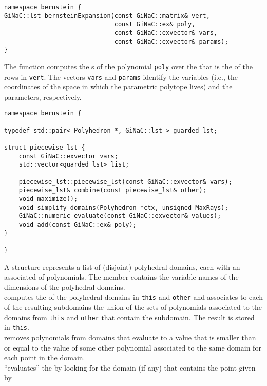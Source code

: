 \begin{verbatim}
namespace bernstein {
GiNaC::lst bernsteinExpansion(const GiNaC::matrix& vert,
                              const GiNaC::ex& poly,
                              const GiNaC::exvector& vars,
                              const GiNaC::exvector& params);
}
\end{verbatim}
The function  computes the
s of the polynomial \verb+poly+
over the  that is the 
of the rows in \verb+vert+.  The vectors \verb+vars+
and \verb+params+ identify the variables (i.e., the coordinates
of the space in which the parametric polytope lives) and
the parameters, respectively.

\begin{verbatim}
namespace bernstein {

typedef std::pair< Polyhedron *, GiNaC::lst > guarded_lst;

struct piecewise_lst {
    const GiNaC::exvector vars;
    std::vector<guarded_lst> list;

    piecewise_lst::piecewise_lst(const GiNaC::exvector& vars);
    piecewise_lst& combine(const piecewise_lst& other);
    void maximize();
    void simplify_domains(Polyhedron *ctx, unsigned MaxRays);
    GiNaC::numeric evaluate(const GiNaC::exvector& values);
    void add(const GiNaC::ex& poly);
}

}
\end{verbatim}
A  structure represents a list of (disjoint)
polyhedral domains, each with an associated 
of polynomials.
The  member contains the variable names of the
dimensions of the polyhedral domains.
\\
 computes the 
of the polyhedral domains in \verb+this+ and \verb+other+ and associates
to each of the resulting subdomains the union of the sets of polynomials
associated to the domains from \verb+this+ and \verb+other+ that contain
the subdomain.
The result is stored in \verb+this+.
\\
 removes polynomials from domains that evaluate
to a value that is smaller than or equal to the value of some
other polynomial associated to the same domain for each point in the domain.
\\
 ``evaluates'' the 
by looking for the domain (if any) that contains the point given by
